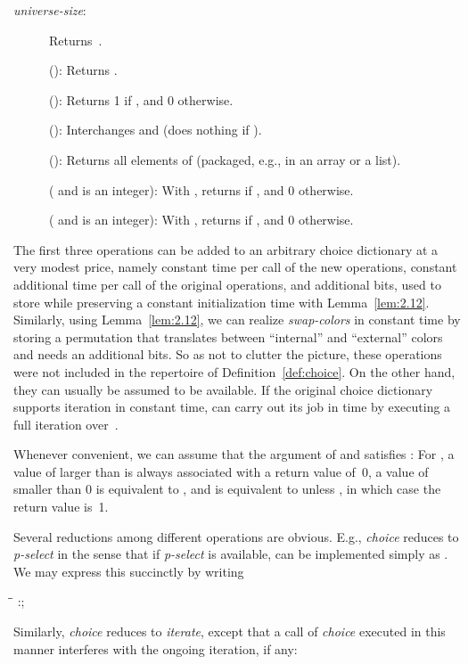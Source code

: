 \documentclass[envcountsame,envcountsect,undated,nolinenumbers]{lnthi}
\def\Tvn#1{\hbox{\textit{#1\/}}}
\begin{document}
\begin{description}
\item[\normalfont\Tvn{universe-size}:]
Returns~.
\item[\normalfont]
():
Returns .
\item[\normalfont]
():
Returns 1 if , and 0 otherwise.
\item[\normalfont]
():
Interchanges  and  (does nothing
if ).
\item[\normalfont]
():
Returns all elements of 
(packaged, e.g., in an array or a list).
\item[\normalfont]
( and  is an integer):
With ,
returns  if , and 0 otherwise.
\item[\normalfont]
( and  is an integer):
With ,
returns  if , and 0 otherwise.
\end{description}

The first three operations can be added to an arbitrary
choice dictionary at a very modest price,
namely constant time per call of the new operations,
constant additional time per call of the
original operations, and
 additional bits, used to store
 while preserving a
constant initialization time with
Lemma~\ref{lem:2.12}.
Similarly, using Lemma~\ref{lem:2.12},
we can realize \Tvn{swap-colors} in constant time
by storing a permutation that translates
between ``internal'' and ``external'' colors
and needs an additional  bits.
So as not to clutter the picture, these operations
were not included in the repertoire of
Definition~\ref{def:choice}.
On the other hand, they can usually be assumed
to be available.
If the original choice dictionary supports
iteration in constant time,
 can carry out its job
in  time by executing a full
iteration over~.

Whenever convenient, we can assume that the
argument  of  and
 satisfies :
For , a value of  larger
than  is always associated with a return value of~0,
a value of  smaller than 0 is
equivalent to , and  is
equivalent to  unless ,
in which case the return value is~1.

Several reductions among different operations
are obvious.
E.g., \Tvn{choice} reduces to \Tvn{p-select}
in the sense that if \Tvn{p-select} is available,
 can be implemented simply as
.
We may express this succinctly
by writing

\begin{tabbing}
\quad\=\hskip 3cm\=\kill
\>:\>;
\end{tabbing}

\noindent
Similarly, \Tvn{choice} reduces to \Tvn{iterate},
except that a call of \Tvn{choice} executed in this
manner interferes with the ongoing iteration, if any:
\end{document}
